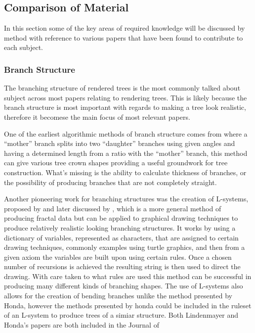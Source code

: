 \documentclass[review]{cmpreport}
\begin{document}
\subsection{Comparison of Material}
In this section some of the key areas of required knowledge will be discussed by 
method with reference to various papers that have been found to contribute to each 
subject.

\subsubsection{Branch Structure}
The branching structure of rendered trees is the most commonly talked about subject 
across most papers relating to rendering trees. This is likely because the branch 
structure is most important with regards to making a tree look realistic, therefore 
it becomese the main focus of most relevant papers. \par
One of the earliest algorithmic methods of branch structure comes from 
\cite{honda1971description} where a ``mother'' branch splits into two ``daughter'' 
branches using given angles and having a determined length from a ratio with the 
``mother'' branch, this method can give various tree crown shapes providing a 
useful groundwork for tree construction. What's missing is the ability to calculate 
thickness of branches, or the possibility of producing branches that are not 
completely straight. \par
Another pioneering work for branching structures was the creation of L-systems, 
proposed by \cite{lindenmayer1968mathematical} and later discussed by 
\cite{prusinkiewicz1996systems}, which is a more general method of producing 
fractal data but can be applied to graphical drawing techniques to produce 
relatively realistic looking branching structures. It works by using a dictionary 
of variables, represented as characters, that are assigned to certain drawing techniques, 
commonly examples using turtle graphics, and then from a given axiom the variables 
are built upon using certain rules. Once a chosen number of recursions is achieved 
the resulting string is then used to direct the drawing. With care taken to what 
rules are used this method can be successful in producing many different kinds of 
branching shapes. The use of L-systems also allows for the creation of bending 
branches unlike the method presented by Honda, however the methods presented by 
honda could be included in the ruleset of an L-system to produce trees of a simiar 
structure. Both Lindenmayer and Honda's papers are both included in the Journal of 
\end{document}
